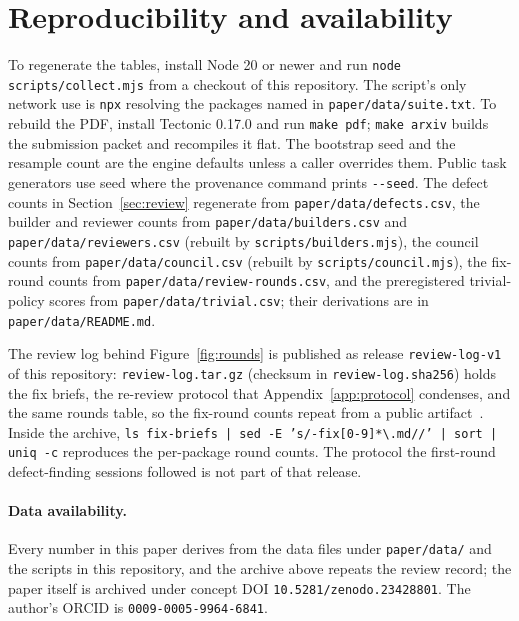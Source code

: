 \section{Reproducibility and availability}
\label{app:reproducibility}
To regenerate the tables, install Node 20 or newer and run \texttt{node scripts/collect.mjs} from a checkout of this repository. The script's only network use is \texttt{npx} resolving the packages named in \texttt{paper/data/suite.txt}. To rebuild the PDF, install Tectonic 0.17.0 and run \texttt{make pdf}; \texttt{make arxiv} builds the submission packet and recompiles it flat. The bootstrap seed and the resample count are the engine defaults unless a caller overrides them. Public task generators use seed \suitePublicSeed{} where the provenance command prints \texttt{-{}-seed}. The defect counts in Section~\ref{sec:review} regenerate from \texttt{paper/data/defects.csv}, the builder and reviewer counts from \texttt{paper/data/builders.csv} and \texttt{paper/data/reviewers.csv} (rebuilt by \texttt{scripts/builders.mjs}), the council counts from \texttt{paper/data/council.csv} (rebuilt by \texttt{scripts/council.mjs}), the fix-round counts from \texttt{paper/data/review-rounds.csv}, and the preregistered trivial-policy scores from \texttt{paper/data/trivial.csv}; their derivations are in \texttt{paper/data/README.md}.

The review log behind Figure~\ref{fig:rounds} is published as release \texttt{review-log-v1} of this repository: \texttt{review-log.tar.gz} (checksum in \texttt{review-log.sha256}) holds the \reviewRoundsTotal{} fix briefs, the re-review protocol that Appendix~\ref{app:protocol} condenses, and the same rounds table, so the fix-round counts repeat from a public artifact~\cite{benchmarkfamily2026reviewlog}. Inside the archive, \texttt{ls fix-briefs | sed -E 's/-fix[0-9]*\textbackslash.md//' | sort | uniq -c} reproduces the per-package round counts. The protocol the first-round defect-finding sessions followed is not part of that release.

\paragraph{Data availability.}
Every number in this paper derives from the data files under \texttt{paper/data/} and the scripts in this repository, and the archive above repeats the review record; the paper itself is archived under concept DOI \texttt{10.5281/zenodo.23428801}. The author's ORCID is \texttt{0009-0005-9964-6841}.


